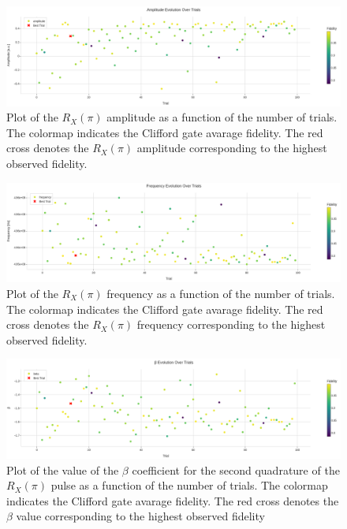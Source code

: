 \begin{figure}[h!]
    \centering
    \includegraphics[width=\textwidth]{figures/png/RB_optimization/Optuna/100/amplitude.png}
    \caption{Plot of the $R_X(\pi)$ amplitude as a function of the number of trials.
    The colormap indicates the Clifford gate avarage fidelity.  
    The red cross denotes the $R_X(\pi)$ amplitude corresponding to the highest observed fidelity.}
    \label{fig:optuna100:amplitude}
\end{figure}

\begin{figure}[h!]
    \centering
    \includegraphics[width=\textwidth]{figures/png/RB_optimization/Optuna/100/frequency.png}
    \caption{Plot of the $R_X(\pi)$ frequency as a function of the number of trials. 
    The colormap indicates the Clifford gate avarage fidelity.  
    The red cross denotes the $R_X(\pi)$ frequency corresponding to the highest observed fidelity.}
    \label{fig:optuna100:frequency}
\end{figure}

\begin{figure}[h!]
    \centering
    \includegraphics[width=\textwidth]{figures/png/RB_optimization/Optuna/100/beta.png}
    \caption{Plot of the value of the $\beta$ coefficient for the second quadrature of the $R_X(\pi)$ pulse as a function of the number of trials. 
    The colormap indicates the Clifford gate avarage fidelity.  
    The red cross denotes the $\beta$ value corresponding to the highest observed fidelity}
    \label{fig:optuna100:beta}
\end{figure}

